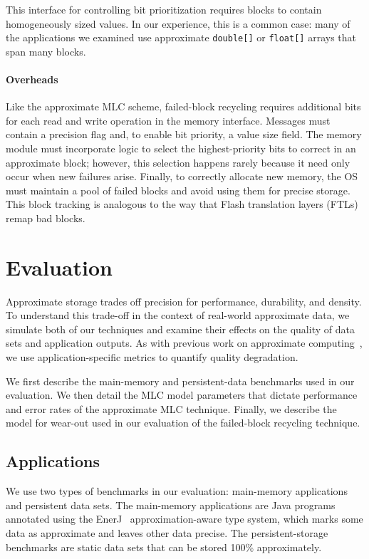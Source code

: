 This interface for controlling bit prioritization requires blocks to contain
homogeneously sized values. In our experience, this is a common case: many of
the applications we examined use approximate
\texttt{double[]} or \texttt{float[]} arrays that span many blocks.

\paragraph{Overheads}

Like the approximate MLC scheme, failed-block recycling requires additional
bits for each read and write operation in the memory interface.
Messages must contain a precision flag and, to enable bit priority, a value
size field.
The memory module must incorporate logic to select the highest-priority bits
to correct in an approximate block; however, this selection happens rarely
because it need only occur when new failures arise.
Finally, to correctly allocate new memory, the OS must maintain a pool of
failed blocks and avoid using them for precise storage.
This block tracking is analogous to the way that Flash translation
layers (FTLs) remap bad blocks.


\section{Evaluation}
\label{approxstorage:sec:eval}

Approximate storage trades off precision for performance, durability, and density.
To understand this trade-off in the context of real-world approximate data, we
simulate both of our techniques and examine their effects on the quality of
data sets and application outputs. As with previous work on approximate
computing~\cite{enerj,npu,perforation}, we use
application-specific metrics to quantify quality
degradation.

We first describe the main-memory and persistent-data benchmarks used in our
evaluation. We then detail the MLC model parameters that dictate performance
and error rates of the approximate MLC technique. Finally, we describe the
model for wear-out used in our evaluation of the failed-block recycling
technique.

\subsection{Applications}

We use two types of benchmarks in our evaluation: main-memory applications and
persistent data sets. The main-memory applications are Java programs annotated
using the EnerJ~\cite{enerj} approximation-aware type system, which marks some
data as approximate and leaves other data precise. The persistent-storage
benchmarks are static data sets that can be stored 100\% approximately.

